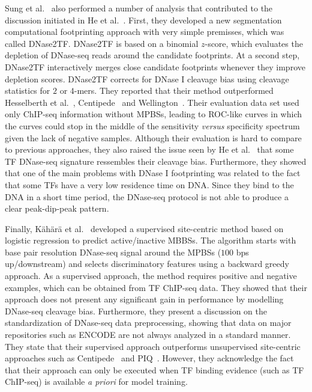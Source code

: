 Sung et al.~\cite{sung2014} also performed a number of analysis that contributed to the discussion initiated in He et al.~\cite{he2014}. First, they developed a new segmentation computational footprinting approach with very simple premisses, which was called DNase2TF. DNase2TF is based on a binomial $z$-score, which evaluates the depletion of DNase-seq reads around the candidate footprints. At a second step, DNase2TF interactively merges close candidate footprints whenever they improve depletion scores. DNase2TF corrects for DNase I cleavage bias using cleavage statistics for $2$ or $4$-mers. They reported that their method outperformed Hesselberth et al.~\cite{hesselberth2009}, Centipede~\cite{pique2011} and Wellington~\cite{piper2013}. Their evaluation data set used only ChIP-seq information without MPBSs, leading to ROC-like curves in which the curves could stop in the middle of the sensitivity \emph{versus} specificity spectrum given the lack of negative samples. Although their evaluation is hard to compare to previous approaches, they also raised the issue seen by He et al.~\cite{he2014} that some TF DNase-seq signature ressembles their cleavage bias. Furthermore, they showed that one of the main problems with DNase I footprinting was related to the fact that some TFs have a very low residence time on DNA. Since they bind to the DNA in a short time period, the DNase-seq protocol is not able to produce a clear peak-dip-peak pattern.

Finally, K\"{a}h\"{a}r\"{a} et al.~\cite{kahara2015} developed a supervised site-centric method based on logistic regression to predict active/inactive MBBSs. The algorithm starts with base pair resolution DNase-seq signal around the MPBSs ($100$ bps up/downstream) and selects discriminatory features using a backward greedy approach. As a supervised approach, the method requires positive and negative examples, which can be obtained from TF ChIP-seq data. They showed that their approach does not present any significant gain in performance by modelling DNase-seq cleavage bias. Furthermore, they present a discussion on the standardization of DNase-seq data preprocessing, showing that data on major repositories such as ENCODE are not always analyzed in a standard manner. They state that their supervised approach outperforms unsupervised site-centric approaches such as Centipede~\cite{pique2011} and PIQ~\cite{sherwood2014}. However, they acknowledge the fact that their approach can only be executed when TF binding evidence (such as TF ChIP-seq) is available \emph{a priori} for model training.

